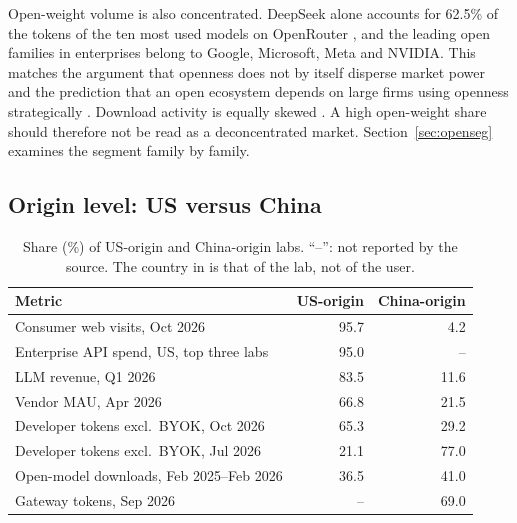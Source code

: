 \documentclass[11pt]{article}
\begin{document}
Open-weight volume is also concentrated. DeepSeek alone accounts for 62.5\% of the tokens of the ten most used models on OpenRouter \cite{openrouter2026rankings}, and the leading open families in enterprises belong to Google, Microsoft, Meta and NVIDIA. This matches the argument that openness does not by itself disperse market power \cite{widder2024open} and the prediction that an open ecosystem depends on large firms using openness strategically \cite{azoulay2025old}. Download activity is equally skewed \cite{osborne2024ai,hf2026summer}. A high open-weight share should therefore not be read as a deconcentrated market. Section~\ref{sec:openseg} examines the segment family by family.

\subsection{Origin level: US versus China}
\label{sec:origin}

\begin{table}[t]
\centering\small
\caption{Share (\%) of US-origin and China-origin labs. ``--'': not reported by the source. The country in \cite{aimultiple2026share} is that of the lab, not of the user.}
\label{tab:origin}
\begin{tabular}{@{}lrr@{}}
\toprule
Metric & US-origin & China-origin \\
\midrule
Consumer web visits, Oct 2026 \cite{aimultiple2026share} & 95.7 & 4.2 \\
Enterprise API spend, US, top three labs \cite{menlo2026state} & 95.0 & -- \\
LLM revenue, Q1 2026 \cite{counterpoint2026revenue} & 83.5 & 11.6 \\
Vendor MAU, Apr 2026 \cite{counterpoint2026mau} & 66.8 & 21.5 \\
Developer tokens excl.\ BYOK, Oct 2026 \cite{aimultiple2026share} & 65.3 & 29.2 \\
Developer tokens excl.\ BYOK, Jul 2026 \cite{aimultiple2026share} & 21.1 & 77.0 \\
Open-model downloads, Feb 2025--Feb 2026 \cite{hf2026spring} & 36.5 & 41.0 \\
Gateway tokens, Sep 2026 \cite{openrouter2026tokens} & -- & 69.0 \\
\bottomrule
\end{tabular}
\end{table}
\end{document}
